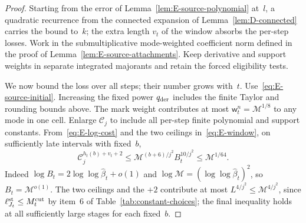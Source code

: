 \begin{proof}
Starting from the error of Lemma~\ref{lem:E-source-polynomial} at~$l$, a quadratic recurrence from the connected expansion of Lemma~\ref{lem:D-connected} carries the bound to~$k$; the extra length $v_t$ of the window absorbs the per-step losses. Work in the submultiplicative mode-weighted coefficient norm defined in the proof of Lemma~\ref{lem:E-source-attachments}. Keep derivative and support weights in separate integrated majorants and retain the forced eligibility tests.

We now bound the loss over all steps; their number grows with~$t$. Use~\eqref{eq:E-source-initial}. Increasing the fixed power $q_{\rm der}$ includes the finite Taylor and rounding bounds above. The mark weight contributes at most $\mathsf w_t^n=\mathcal M^{1/8}$ to any mode in one cell. Enlarge $\mathcal C_j$ to include all per-step finite polynomial and support constants. From~\eqref{eq:E-log-cost} and the two ceilings in~\eqref{eq:E-window}, on sufficiently late intervals with fixed~$b$,
\begin{equation}\label{eq:E-source-loss}
 \mathcal C_j^{h_t(b)+v_t+2}
 \le\mathcal M^{(b+6)/j^2}B_t^{10/j^2}
 \le\mathcal M^{1/64}.
\end{equation}
Indeed $\log B_t=2\log\log\widehat\beta_t+o(1)$ and $\log\mathcal M=(\log\log\widehat\beta_t)^2$, so $B_t=\mathcal M^{o(1)}$. The two ceilings and the $+2$ contribute at most $L^{4/j^2}\le\mathcal M^{4/j^2}$, since $\ell^{\rm st}_{J_t}\le M^{\mathrm{cut}}_t$ by item~6 of Table~\ref{tab:constant-choices}; the final inequality holds at all sufficiently large stages for each fixed~$b$.


\end{proof}
